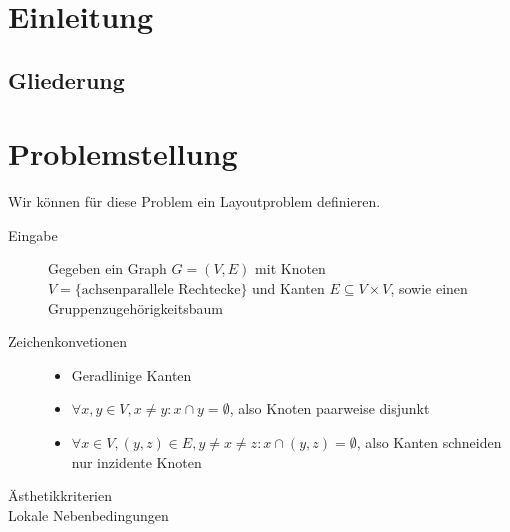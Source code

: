 \section{Einleitung}



%



\subsection{Gliederung}

\section{Problemstellung}
Wir können für diese Problem ein Layoutproblem definieren.

\begin{description}
\item[Eingabe] Gegeben ein Graph $G=(V,E)$ mit Knoten $V = \{ \text{achsenparallele Rechtecke}\}$ und  Kanten $E \subseteq V \times V$,
sowie einen Gruppenzugehörigkeitsbaum 

\item[Zeichenkonvetionen]
	\begin{itemize}
	\item Geradlinige Kanten
	\item $\forall x,y\in V, x \neq y: x \cap y = \emptyset$, also Knoten paarweise disjunkt
	\item $\forall x \in V, (y,z) \in E, y\neq x\neq z: x \cap (y,z) = \emptyset$, also Kanten schneiden nur inzidente Knoten
	\end{itemize}

\item[Ästhetikkriterien]

\item[Lokale Nebenbedingungen]

\end{description}

